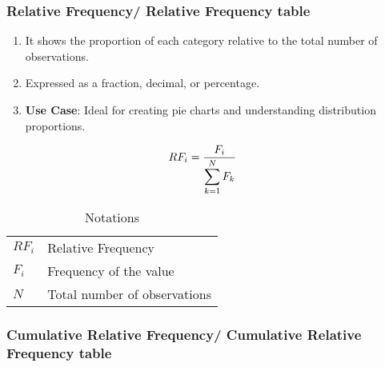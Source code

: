 \subsubsection{Relative Frequency/ Relative Frequency table \cite{statistics/book/Statistics-for-Data-Scientists/Maurits-Kaptein}}\label{Data/Describing Data/Frequency or Frequency table/Relative}

\begin{enumerate}
    \item It shows the proportion of each category relative to the total number of observations. \cite{common/online/chatgpt}

    \item Expressed as a fraction, decimal, or percentage. \cite{common/online/chatgpt}

    \item \textbf{Use Case}: Ideal for creating pie charts and understanding distribution proportions. \cite{common/online/chatgpt}
\end{enumerate}


\begin{table}[H]
    \begin{minipage}{0.3\linewidth}
        \[
            \begin{aligned}
                RF_i 
                    &= \dfrac{F_{i}}{\displaystyle\sum_{k=1}^{N} F_{k}}
            \end{aligned}
        \]
    \end{minipage}
    \begin{minipage}{0.65\linewidth}
        \begin{table}[H]
            \begin{tabular}{l l}
                $RF_i$ & Relative Frequency \\
                $F_i$ & Frequency of the value \\ 
                $N$ & Total number of observations \\ 
            \end{tabular}
            \caption*{Notations}
        \end{table}
    \end{minipage}
\end{table}




\subsubsection{Cumulative Relative Frequency/ Cumulative Relative Frequency table \cite{statistics/book/Statistics-for-Data-Scientists/Maurits-Kaptein}}\label{Data/Describing Data/Frequency or Frequency table/Cumulative Relative}

